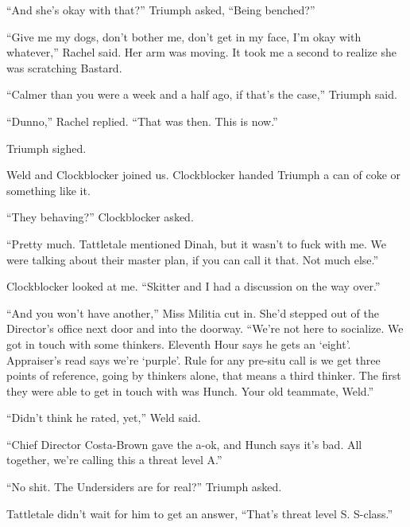 ``And she's okay with that?'' Triumph asked,  ``Being benched?''



``Give me my dogs, don't bother me, don't get in my face, I'm okay with whatever,'' Rachel said.  Her arm was moving.  It took me a second to realize she was scratching Bastard.



``Calmer than you were a week and a half ago, if that's the case,'' Triumph said.



``Dunno,'' Rachel replied.  ``That was then.  This is now.''



Triumph sighed.



Weld and Clockblocker joined us.  Clockblocker handed Triumph a can of coke or something like it.



``They behaving?'' Clockblocker asked.



``Pretty much.  Tattletale mentioned Dinah, but it wasn't to fuck with me.  We were talking about their master plan, if you can call it that.  Not much else.''



Clockblocker looked at me.  ``Skitter and I had a discussion on the way over.''



``And you won't have another,'' Miss Militia cut in.  She'd stepped out of the Director's office next door and into the doorway.  ``We're not here to socialize.  We got in touch with some thinkers.  Eleventh Hour says he gets an `eight'.  Appraiser's read says we're `purple'.  Rule for any pre-situ call is we get three points of reference,  going by thinkers alone, that means a third thinker.  The first they were able to get in touch with was Hunch.  Your old teammate, Weld.''



``Didn't think he rated, yet,'' Weld said.



``Chief Director Costa-Brown gave the a-ok, and Hunch says it's bad.  All together, we're calling this a threat level A.''



``No shit.  The Undersiders are for real?''  Triumph asked.



Tattletale didn't wait for him to get an answer, ``That's threat level S.  S-class.''



